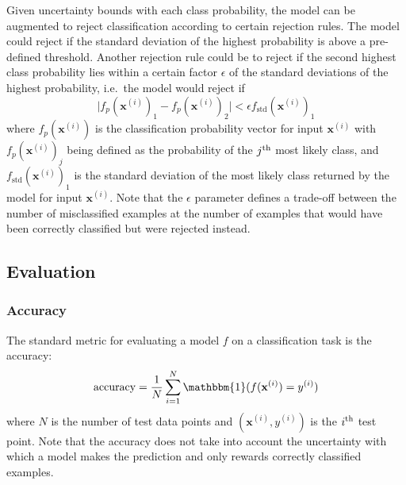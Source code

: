 \documentclass{article}
\begin{document}
Given uncertainty bounds with each class probability, the model can be augmented to reject classification according to certain rejection rules. The model could reject if the standard deviation of the highest probability is above a pre-defined threshold. Another rejection rule could be to reject if the second highest class probability lies within a certain factor $\epsilon$ of the standard deviations of the highest probability, i.e.\ the model would reject if
\begin{equation*}
	\vert f_p(\mathbf{x}^{(i)})_1 - f_p(\mathbf{x}^{(i)})_2 \vert < \epsilon f_{\textrm{std}}(\mathbf{x}^{(i)})_1
\end{equation*}
where $f_p(\mathbf{x}^{(i)})$ is the classification probability vector for input $\mathbf{x}^{(i)}$ with $f_p(\mathbf{x}^{(i)})_j$ being defined as the probability of the $j\textsuperscript{th}$ most likely class, and $f_{\textrm{std}}(\mathbf{x}^{(i)})_1$ is the standard deviation of the most likely class returned by the model for input $\mathbf{x}^{(i)}$. Note that the $\epsilon$ parameter defines a trade-off between the number of misclassified examples at the number of examples that would have been correctly classified but were rejected instead.

\subsection{Evaluation}
\subsubsection{Accuracy}
The standard metric for evaluating a model $f$ on a classification task is the accuracy: 
\begin{equation*}
	\textrm{accuracy} = \frac{1}{N} \sum_{i=1}^N \mathbbm{1}(f(\mathbf{x}^{(i)}) = y^{(i)})
\end{equation*}
where $N$ is the number of test data points and $(\mathbf{x}^{(i)}, y^{(i)})$ is the $i\textsuperscript{th}$ test point. Note that the accuracy does not take into account the uncertainty with which a model makes the prediction and only rewards correctly classified examples.
\end{document}
